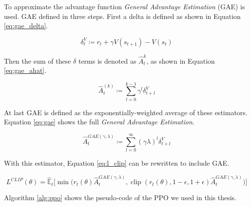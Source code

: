 To approximate the advantage function \emph{General Advantage Estimation} (GAE) is used.
GAE defined in three steps.
First a delta is defined as shown in Equation \ref{eq:gae_delta}.
\begin{defn}
\begin{equation}
  \label{eq:gae_delta}
  \delta_t^V \coloneqq r_t + \gamma V(s_{t+1}) - V(s_t)
\end{equation}
\end{defn}

Then the sum of these $\delta$ terms is denoted as $\hat{A}_t^{k}$, as shown in Equation \ref{eq:gae_ahat}.

\begin{defn}
\begin{equation}
  \label{eq:gae_ahat}
  \hat{A}_t^{(k)} \coloneqq \sum_{l=0}^{k-1} \gamma^l \delta_{t+l}^V
\end{equation}
\end{defn}

At last GAE is defined as the exponentially-weighted average of these estimators.
Equation \ref{eq:gae} shows the full \emph{General Advantage Estimation}.

\begin{defn}
\begin{equation}
  \label{eq:gae}
  \hat{A}_t^{GAE(\gamma,\lambda)} \coloneqq \sum_{l=0}^{\infty}(\gamma \lambda)^l \delta_{t+l}^V
\end{equation}
\end{defn}

With this estimator, Equation \ref{eq:l_clip} can be rewritten to include GAE.

\begin{equation}
  \label{eq:l_clip_GAE}
	L^{CLIP}(\theta) = \hat{\mathbb{E}}_{t}\bigg[\min \Big(r_t(\theta) \hat{A}_t^{GAE(\gamma,\lambda)}, \operatorname*{clip}(r_t(\theta), 1 - \epsilon, 1 + \epsilon) \hat{A}_t^{GAE(\gamma,\lambda)} \Big)\bigg]
\end{equation}

Algorithm \ref{alg:ppo} shows the pseudo-code of the PPO we used in this thesis.

